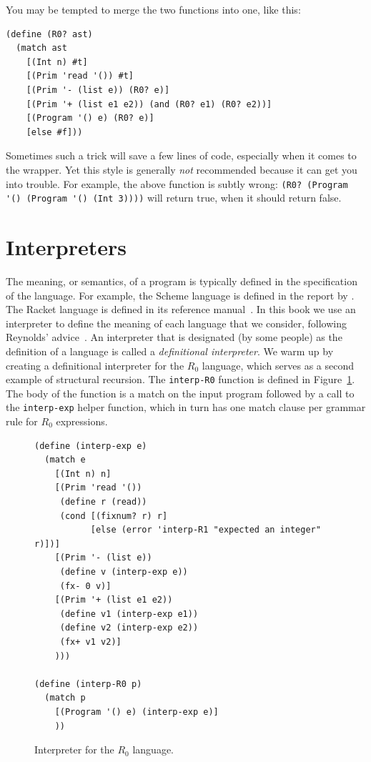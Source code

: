 \documentclass[11pt]{book}
\begin{document}
You may be tempted to merge the two functions into one, like this:
\begin{center}
\begin{minipage}{0.5\textwidth}
\begin{lstlisting}
(define (R0? ast)
  (match ast
    [(Int n) #t]
    [(Prim 'read '()) #t]
    [(Prim '- (list e)) (R0? e)]
    [(Prim '+ (list e1 e2)) (and (R0? e1) (R0? e2))]
    [(Program '() e) (R0? e)]
    [else #f]))
\end{lstlisting}
\end{minipage}
\end{center}
%
Sometimes such a trick will save a few lines of code, especially when
it comes to the  wrapper.  Yet this style is generally
\emph{not} recommended because it can get you into trouble.
%
For example, the above function is subtly wrong:
\lstinline{(R0? (Program '() (Program '() (Int 3))))}
will return true, when it should return false.



\section{Interpreters}
\label{sec:interp-R0}

The meaning, or semantics, of a program is typically defined in the
specification of the language. For example, the Scheme language is
defined in the report by \cite{SPERBER:2009aa}. The Racket language is
defined in its reference manual~\citep{plt-tr}. In this book we use an
interpreter to define the meaning of each language that we consider,
following Reynolds' advice~\citep{reynolds72:_def_interp}. An
interpreter that is designated (by some people) as the definition of a
language is called a \emph{definitional interpreter}.  We warm up by
creating a definitional interpreter for the $R_0$ language, which
serves as a second example of structural recursion. The
\texttt{interp-R0} function is defined in
Figure~\ref{fig:interp-R0}. The body of the function is a match on the
input program followed by a call to the \lstinline{interp-exp} helper
function, which in turn has one match clause per grammar rule for
$R_0$ expressions.

\begin{figure}[tbp]
\begin{lstlisting}
(define (interp-exp e)
  (match e
    [(Int n) n]
    [(Prim 'read '())
     (define r (read))
     (cond [(fixnum? r) r]
           [else (error 'interp-R1 "expected an integer" r)])]
    [(Prim '- (list e))
     (define v (interp-exp e))
     (fx- 0 v)]
    [(Prim '+ (list e1 e2))
     (define v1 (interp-exp e1))
     (define v2 (interp-exp e2))
     (fx+ v1 v2)]
    )))

(define (interp-R0 p)
  (match p
    [(Program '() e) (interp-exp e)]
    ))
\end{lstlisting}
\caption{Interpreter for the $R_0$ language.}
\label{fig:interp-R0}
\end{figure}
\end{document}
